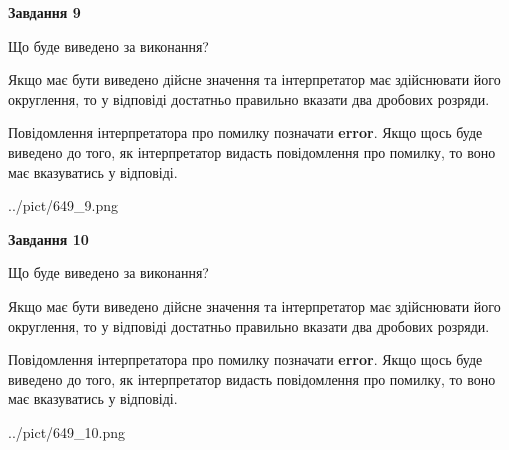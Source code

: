 \documentclass[12pt, ukrainian]{article}
\begin{document}
{\begin {Large}
{\begin {center}\textbf{Завдання 9}\end {center}}\par
Що буде виведено за виконання? \par

Якщо має бути виведено дійсне значення та інтерпретатор має здійснювати його округлення, 
то у відповіді достатньо правильно вказати два дробових розряди.

Повідомлення інтерпретатора про помилку позначати \textbf{error}.
Якщо щось буде виведено до того, як інтерпретатор видасть повідомлення про помилку, 
то воно має вказуватись у відповіді. \par

\begin{center}
	{../pict/649_9.png}
\end{center}
\newpage

{\begin {center}\textbf{Завдання 10}\end {center}}\par
Що буде виведено за виконання? \par

Якщо має бути виведено дійсне значення та інтерпретатор має здійснювати його округлення, 
то у відповіді достатньо правильно вказати два дробових розряди.

Повідомлення інтерпретатора про помилку позначати \textbf{error}.
Якщо щось буде виведено до того, як інтерпретатор видасть повідомлення про помилку, 
то воно має вказуватись у відповіді. \par

\begin{center}
	{../pict/649_10.png}
\end{center}
\newpage

\end {Large}}
\end{document}
